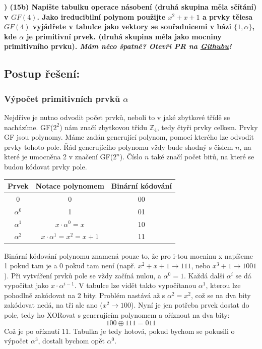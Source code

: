 \documentclass[10pt,a4paper]{article}
\newcommand{\footer}{{\small\em Mám něco špatně? Otevři PR na \href{https://github.com/kosciCZ/MAT-GF}{Githubu}!}}
\begin{document}
\bfseries{}) (15b) Napište tabulku operace násobení (druhá skupina měla sčítání) v $GF(4)$. Jako ireducibilní  polynom použijte $x^2 + x + 1$ a prvky tělesa $GF(4)$ vyjádřete v tabulce jako vektory se souřadnicemi v bázi $\lbrace 1,\alpha \rbrace$, kde $\alpha$ je primitivní prvek. (druhá skupina měla jako mocniny primitivního prvku).\normalfont
 \footer
\subsection*{Postup řešení:}
\subsubsection*{Výpočet primitivních prvků $\alpha$}
Nejdříve je nutno odvodit počet prvků, neboli to v jaké zbytkové třídě se nacházíme. GF($2^{2}$) nám značí zbytkovou třídu $\mathbb{Z}_{4}$, tedy čtyři prvky celkem. Prvky GF jsou polynomy. Máme zadán generující polynom, pomocí kterého lze odvodit prvky tohoto pole. Řád generujícího polynomu vždy bude shodný s číslem $n$, na které je umocněna 2 v značení GF($2^{n}$). Číslo $n$ také značí počet bitů, na které se budou kódovat prvky pole.

\renewcommand{\arraystretch}{1.5}%
\begin{table}[h]
	\centering
	\begin{tabular}{|c|c|c|}
		\hline
		\textbf{Prvek} & \textbf{Notace polynomem} & \textbf{Binární kódování} \\\hline
		0 & 0 & 00 \\\hline 
		$\alpha^{0}$ &  1 & 01 \\\hline 
		$\alpha^{1}$ & $x\cdot\alpha^{0}=x$ & 10 \\\hline 
		$\alpha^{2}$ & $x\cdot\alpha^{1}=x^{2} = x + 1$ & 11 \\\hline 
	\end{tabular}
\end{table}

Binární kódování polynomu znamená pouze to, že pro i-tou mocninu x napíšeme 1 pokud tam je a 0 pokud tam není (např. $x^2 + x + 1 \to 111$, nebo $x^3 + 1 \to 1001$). Při vytváření prvků pole se vždy začíná nulou, a $\alpha^{0} = 1$. Každá další $\alpha^{i}$ se dá vypočítat jako $x\cdot\alpha^{i-1}$. V tabulce lze vidět takto vypočítanou $\alpha^{1}$, kterou lze pohodlně zakódovat na 2 bity. Problém nastává až s $\alpha^{2} = x^{2}$, což se na dva bity zakódovat nedá, na tři ale ano ($x^{2} \to 100$). Nyní je jen potřeba prvek dostat do pole, tedy ho XORovat s generujícím polynomem a oříznout na dva bity:
$$ 100 \oplus 111 = 011 $$
Což je po oříznutí $11$. Tabulka je tedy hotová, pokud bychom se pokusili o výpočet $\alpha^{3}$, dostali bychom opět $\alpha^{0}$.
\end{document}
